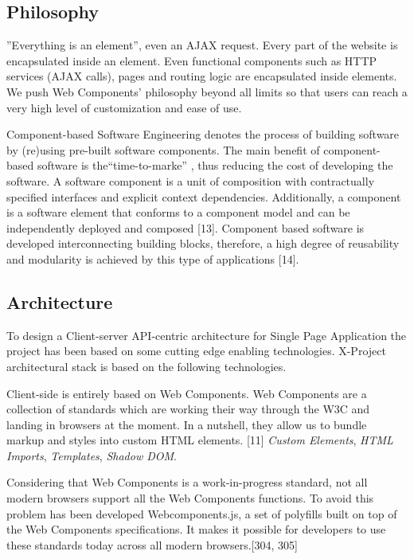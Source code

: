 \documentclass{sig-alternate}
\begin{document}
\subsection{Philosophy}
''Everything is an element'', even an AJAX request. Every part of the website is encapsulated inside an element. Even functional components such as HTTP services (AJAX calls), pages and routing logic are encapsulated inside elements. We push Web Components' philosophy beyond all limits so that users can reach a very high level of customization and ease of use.




Component-based Software Engineering denotes the process of building software by (re)using pre-built software components. The main benefit of component-based software is the``time-to-marke'' \cite{4773208}, thus reducing the cost of developing the software. A software component is a unit of composition with contractually specified interfaces and explicit context dependencies. 
Additionally, a component is a software element that conforms to a component model and can be independently deployed and composed \cite{cite:test} [13]. Component based software is developed interconnecting building blocks, therefore, a high degree of reusability and modularity is achieved by this type of applications [14]. 















\subsection{Architecture}
To design a Client-server API-centric architecture for Single Page Application the project has been based on some cutting edge enabling technologies.
X-Project architectural stack is based on the following technologies.


Client-side is entirely based on Web Components.
Web Components are a collection of standards which are working their way through the W3C and landing in browsers at the moment. In a nutshell, they allow us to bundle markup and styles into custom HTML elements. [11]
 \emph{Custom Elements}\cite{customel}, \emph{HTML Imports}\cite{customel}, \emph{Templates}\cite{customel}, \emph{Shadow DOM}\cite{customel}.


Considering that Web Components is a work-in-progress standard, not all modern browsers support all the Web Components functions.
To avoid this problem has been developed Webcomponents.js, a set of polyfills built on top of the Web Components specifications. It makes it possible for developers to use these standards today across all modern browsers.[304, 305]
\end{document}
